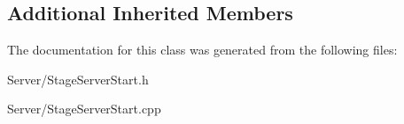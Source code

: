 \subsection*{Additional Inherited Members}


The documentation for this class was generated from the following files\-:\begin{DoxyCompactItemize}
\item 
Server/Stage\-Server\-Start.\-h\item 
Server/Stage\-Server\-Start.\-cpp\end{DoxyCompactItemize}
